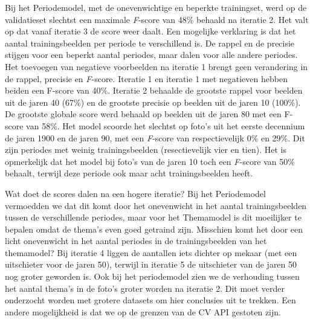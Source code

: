 Bij het Periodemodel, met de onevenwichtige en beperkte trainingset, werd op de validatieset slechtst een maximale \textit{F}-score van 48\% behaald na iteratie 2. Het valt op dat vanaf iteratie 3 de score weer daalt. Een mogelijke verklaring is dat het aantal trainingsbeelden per periode te verschillend is. De rappel en de precisie stijgen voor een beperkt aantal periodes, maar dalen voor alle andere periodes. Het toevoegen van negatieve voorbeelden na iteratie 1 brengt geen verandering in de rappel, precisie en \textit{F}-score. Iteratie 1 en iteratie 1 met negatieven hebben beiden een F-score van 40\%. Iteratie 2 behaalde de grootste rappel voor beelden uit de jaren 40 (67\%) en de grootste precisie op beelden uit de jaren 10 (100\%). De grootste globale score werd behaald op beelden uit de jaren 80 met een F-score van 58\%. Het model scoorde het slechtst op foto’s uit het eerste decennium de jaren 1900 en de jaren 90, met een \textit{F}-score van respectievelijk 0\% en 29\%. Dit zijn periodes met weinig trainingsbeelden (resectievelijk vier en tien). Het is opmerkelijk dat het model bij foto's van de jaren 10 toch een \textit{F}-score van 50\% behaalt, terwijl deze periode ook maar acht trainingsbeelden heeft.

Wat doet de scores dalen na een hogere iteratie? Bij het Periodemodel vermoedden we dat dit komt door het onevenwicht in het aantal trainingsbeelden tussen de verschillende periodes, maar voor het Themamodel is dit moeilijker te bepalen omdat de thema’s even goed getraind zijn. Misschien komt het door een licht onevenwicht in het aantal periodes in de trainingsbeelden van het themamodel? Bij iteratie 4 liggen de aantallen iets dichter op mekaar (met een uitschieter voor de jaren 50), terwijl in iteratie 5 de uitschieter van de jaren 50 nog groter geworden is. Ook bij het periodemodel zien we de verhouding tussen het aantal thema’s in de foto’s groter worden na iteratie 2. Dit moet verder onderzocht worden met grotere datasets om hier conclusies uit te trekken. Een andere mogelijkheid is dat we op de grenzen van de CV API gestoten zijn.
